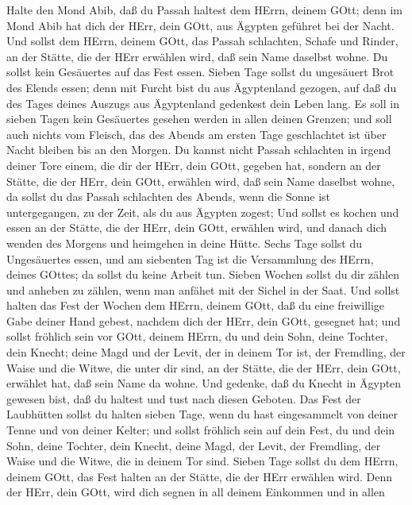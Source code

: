 Halte den Mond Abib, daß du Passah haltest dem HErrn,
deinem GOtt; denn im Mond Abib hat dich der HErr, dein GOtt, aus Ägypten
geführet bei der Nacht.  Und sollst dem HErrn, deinem GOtt,
das Passah schlachten, Schafe und Rinder, an der Stätte, die der HErr
erwählen wird, daß sein Name daselbst wohne.  Du sollst kein
Gesäuertes auf das Fest essen. Sieben Tage sollst du ungesäuert Brot des
Elends essen; denn mit Furcht bist du aus Ägyptenland gezogen, auf daß
du des Tages deines Auszugs aus Ägyptenland gedenkest dein Leben lang.
 Es soll in sieben Tagen kein Gesäuertes gesehen werden in
allen deinen Grenzen; und soll auch nichts vom Fleisch, das des Abends
am ersten Tage geschlachtet ist über Nacht bleiben bis an den Morgen.
 Du kannst nicht Passah schlachten in irgend deiner Tore
einem, die dir der HErr, dein GOtt, gegeben hat,  sondern an
der Stätte, die der HErr, dein GOtt, erwählen wird, daß sein Name
daselbst wohne, da sollst du das Passah schlachten des Abends, wenn die
Sonne ist untergegangen, zu der Zeit, als du aus Ägypten zogest;
 Und sollst es kochen und essen an der Stätte, die der HErr,
dein GOtt, erwählen wird, und danach dich wenden des Morgens und
heimgehen in deine Hütte.  Sechs Tage sollst du Ungesäuertes
essen, und am siebenten Tag ist die Versammlung des HErrn, deines
GOttes; da sollst du keine Arbeit tun.  Sieben Wochen sollst
du dir zählen und anheben zu zählen, wenn man anfähet mit der Sichel in
der Saat.  Und sollst halten das Fest der Wochen dem HErrn,
deinem GOtt, daß du eine freiwillige Gabe deiner Hand gebest, nachdem
dich der HErr, dein GOtt, gesegnet hat;  und sollst
fröhlich sein vor GOtt, deinem HErrn, du und dein Sohn, deine Tochter,
dein Knecht; deine Magd und der Levit, der in deinem Tor ist, der
Fremdling, der Waise und die Witwe, die unter dir sind, an der Stätte,
die der HErr, dein GOtt, erwählet hat, daß sein Name da wohne.
 Und gedenke, daß du Knecht in Ägypten gewesen bist, daß du
haltest und tust nach diesen Geboten.  Das Fest der
Laubhütten sollst du halten sieben Tage, wenn du hast eingesammelt von
deiner Tenne und von deiner Kelter;  und sollst fröhlich
sein auf dein Fest, du und dein Sohn, deine Tochter, dein Knecht, deine
Magd, der Levit, der Fremdling, der Waise und die Witwe, die in deinem
Tor sind.  Sieben Tage sollst du dem HErrn, deinem GOtt,
das Fest halten an der Stätte, die der HErr erwählen wird. Denn der
HErr, dein GOtt, wird dich segnen in all deinem Einkommen und in allen
